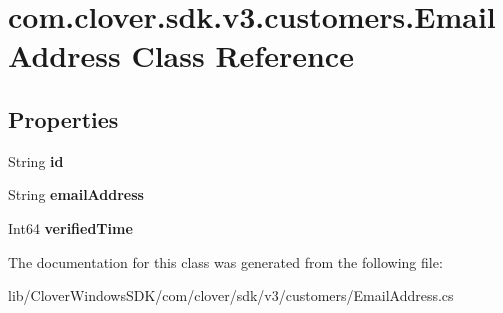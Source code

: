 \hypertarget{classcom_1_1clover_1_1sdk_1_1v3_1_1customers_1_1_email_address}{}\section{com.\+clover.\+sdk.\+v3.\+customers.\+Email\+Address Class Reference}
\label{classcom_1_1clover_1_1sdk_1_1v3_1_1customers_1_1_email_address}
\subsection*{Properties}
\begin{DoxyCompactItemize}
\item 
\mbox{\label{classcom_1_1clover_1_1sdk_1_1v3_1_1customers_1_1_email_address_a3dc876dfe3fb15ad3f8ba0c2d5d5835d}} 
String {\bfseries id}
\item 
\mbox{\label{classcom_1_1clover_1_1sdk_1_1v3_1_1customers_1_1_email_address_ae7cc3a922b170bba56213e48b546be4e}} 
String {\bfseries email\+Address}
\item 
\mbox{\label{classcom_1_1clover_1_1sdk_1_1v3_1_1customers_1_1_email_address_ab66f35ccc4b6f8633c98d6ebfa8fa822}} 
Int64 {\bfseries verified\+Time}
\end{DoxyCompactItemize}


The documentation for this class was generated from the following file\+:\begin{DoxyCompactItemize}
\item 
lib/\+Clover\+Windows\+S\+D\+K/com/clover/sdk/v3/customers/Email\+Address.\+cs\end{DoxyCompactItemize}
